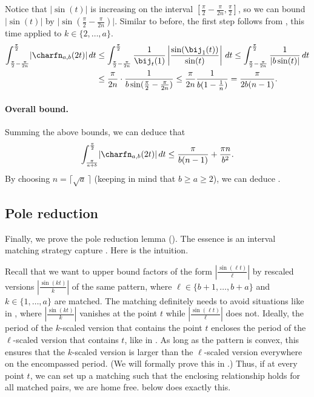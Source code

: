 Notice that $\lvert\sin(t)\rvert$ is increasing on the interval $[\frac{\pi}{2}-\frac{\pi}{2n},\frac{\pi}{2}]$, so we can bound $\lvert\sin(t)\rvert$ by $\lvert\sin(\frac{\pi}{2}-\frac{\pi}{2n})\rvert$. Similar to before, the first step follows from , this time applied to $k \in \{2,\dots,a\}$. 
\begin{align*}
    \int_{\frac{\pi}{2}-\frac{\pi}{2n}}^{\frac{\pi}{2}} \lvert\charfn_{a,b}(2t)\rvert\,dt 
    &\le \int_{\frac{\pi}{2}-\frac{\pi}{2n}}^{\frac{\pi}{2}} \frac{1}{\bij_t(1)} \left\lvert\frac{\sin(\bij_1(t))}{\sin(t)}\right\rvert\,dt
    \le \int_{\frac{\pi}{2}-\frac{\pi}{2n}}^{\frac{\pi}{2}} \frac{1}{|b \sin(t)|}\,dt\\
    &\le \frac{\pi}{2n}\cdot \frac{1}{b\sin(\frac{\pi}{2}-\frac{\pi}{2n})}
    \le \frac{\pi}{2n}\frac{1}{b(1-\frac{1}{n})}
    = \frac{\pi}{2b(n-1)}.
\end{align*}

\paragraph{Overall bound.}

Summing the above bounds, we can deduce that
\[\int_{\frac{\pi}{a+b}}^{\frac{\pi}{2}} \lvert\charfn_{a,b}(2t)\rvert\,dt \le \frac{\pi}{b(n-1)}+\frac{\pi n}{b^2}.  \]
By choosing $n=\lceil\sqrt{a} \,\rceil$ (keeping in mind that $b\ge a \ge 2$), we can deduce .

\subsection{Pole reduction}
\label{sec:pole-reduction}

Finally, we prove the pole reduction lemma (). The essence is an interval matching strategy capture . Here is the intuition. 

Recall that we want to upper bound factors of the form $|\frac{\sin(\ell t)}{\ell}|$ by rescaled versions $|\frac{\sin(k t)}{k}|$ of the same pattern, where $\ell \in \{b+1,\dots,b+a\}$ and $k \in \{1,\dots,a\}$ are matched. The matching definitely needs to avoid situations like in , where $|\frac{\sin(kt)}{k}|$ vanishes at the point $t$ while $|\frac{\sin(\ell t)}{\ell}|$ does not. Ideally, the period of the $k$-scaled version that contains the point $t$ encloses the period of the $\ell$-scaled version that contains $t$, like in . As long as the pattern is convex, this ensures that the $k$-scaled version is larger than the $\ell$-scaled version everywhere on the encompassed period. (We will formally prove this in .) Thus, if at every point $t$, we can set up a matching such that the enclosing relationship holds for all matched pairs, we are home free.  below does exactly this.

